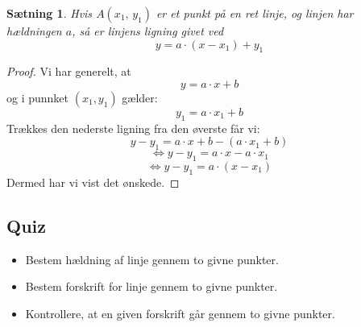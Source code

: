 \documentclass[12pt,oneside,a4paper]{article}
\newtheorem{thm}{Sætning}[section]
\begin{document}
\begin{thm}
    Hvis $A(x_1,\,y_1)$ er et punkt på en ret linje, og linjen har hældningen
    $a$, så er linjens ligning givet ved
    $$
    y = a\cdot (x-x_1) + y_1 
    $$
\end{thm}
\begin{proof}
    Vi har generelt, at 
    $$
    y = a\cdot x + b
    $$
    og i punnket $(x_1, y_1)$ gælder:
    $$
    y_1 = a\cdot x_1 + b
    $$
    Trækkes den nederste ligning fra den øverste får vi:
    $$
    y-y_1 = a \cdot x + b - (a \cdot x_1 + b)
    $$
    $$
    \Leftrightarrow y-y_1 = a \cdot x - a \cdot x_1
    $$
    $$
    \Leftrightarrow y-y_1 = a \cdot (x - x_1)
    $$
    Dermed har vi vist det ønskede.
\end{proof}

\subsection{Quiz}
\begin{itemize}
    \item Bestem hældning af linje gennem to givne punkter.
    \item Bestem forskrift for linje gennem to givne punkter.
    \item Kontrollere, at en given forskrift går gennem to givne punkter.
\end{itemize}
\end{document}
